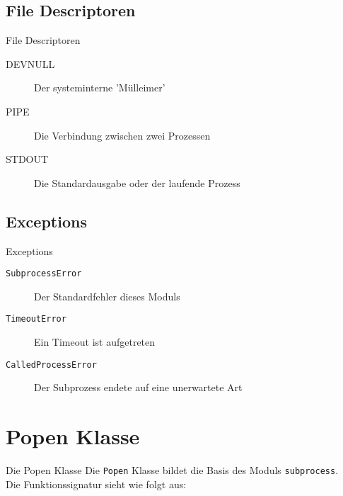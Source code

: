 \subsection{File Descriptoren}
\begin{frame}{File Descriptoren}
	\begin{description}
		\item[DEVNULL] Der systeminterne 'M\"ulleimer'
		\item[PIPE] Die Verbindung zwischen zwei Prozessen
		\item[STDOUT] Die Standardausgabe oder der laufende Prozess
	\end{description}
\end{frame}

\subsection{Exceptions}
\begin{frame}[fragile]{Exceptions}
	\begin{description}
		\item[\texttt{SubprocessError}] Der Standardfehler dieses Moduls
		\item[\texttt{TimeoutError}] Ein Timeout ist aufgetreten
		\item[\texttt{CalledProcessError}] Der Subprozess endete auf eine unerwartete Art
	\end{description}
\end{frame}


\section{Popen Klasse}
\begin{frame}[fragile]{Die Popen Klasse}
	Die \texttt{Popen} Klasse bildet die Basis des Moduls \texttt{subprocess}. \\
	Die Funktionssignatur sieht wie folgt aus:
	
\end{frame}

